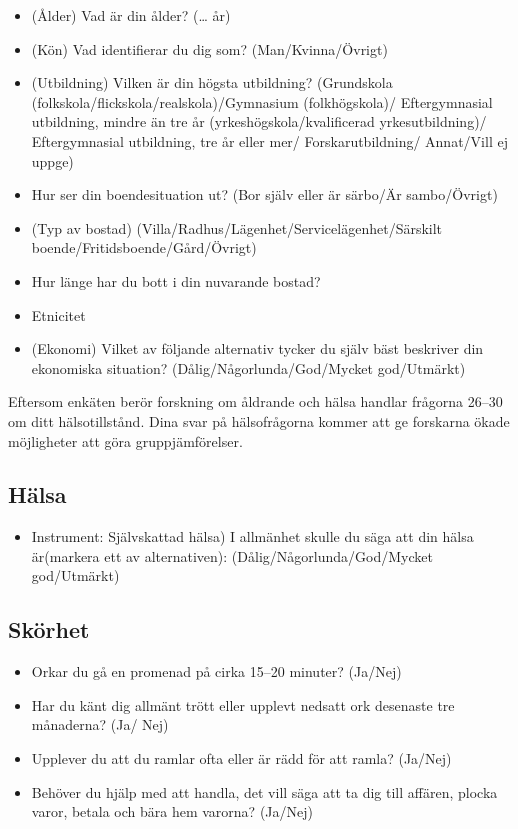 \documentclass[]{tufte-handout}
\providecommand{\tightlist}{%
  \setlength{\itemsep}{0pt}\setlength{\parskip}{0pt}}
\begin{document}
\begin{itemize}
\tightlist
\item
  (Ålder) Vad är din ålder? (\ldots{} år)
\item
  (Kön) Vad identifierar du dig som? (Man/Kvinna/Övrigt)
\item
  (Utbildning) Vilken är din högsta utbildning? (Grundskola
  (folkskola/flickskola/realskola)/Gymnasium (folkhögskola)/
  Eftergymnasial utbildning, mindre än tre år
  (yrkeshögskola/kvalificerad yrkesutbildning)/ Eftergymnasial
  utbildning, tre år eller mer/ Forskarutbildning/ Annat/Vill ej uppge)
\item
  Hur ser din boendesituation ut? (Bor själv eller är särbo/Är
  sambo/Övrigt)
\item
  (Typ av bostad) (Villa/Radhus/Lägenhet/Servicelägenhet/Särskilt
  boende/Fritidsboende/Gård/Övrigt)
\item
  Hur länge har du bott i din nuvarande bostad?
\item
  Etnicitet
\item
  (Ekonomi) Vilket av följande alternativ tycker du själv bäst beskriver
  din ekonomiska situation? (Dålig/Någorlunda/God/Mycket god/Utmärkt)
\end{itemize}

Eftersom enkäten berör forskning om åldrande och hälsa handlar frågorna
26--30 om ditt hälsotillstånd. Dina svar på hälsofrågorna kommer att ge
forskarna ökade möjligheter att göra gruppjämförelser.

\hypertarget{huxe4lsa}{%
\subsection{Hälsa}\label{huxe4lsa}}

\begin{itemize}
\tightlist
\item
  Instrument: Självskattad hälsa) I allmänhet skulle du säga att din
  hälsa är(markera ett av alternativen): (Dålig/Någorlunda/God/Mycket
  god/Utmärkt)
\end{itemize}

\hypertarget{skuxf6rhet}{%
\subsection{Skörhet}\label{skuxf6rhet}}

\begin{itemize}
\tightlist
\item
  Orkar du gå en promenad på cirka 15--20 minuter? (Ja/Nej)
\item
  Har du känt dig allmänt trött eller upplevt nedsatt ork desenaste tre
  månaderna? (Ja/ Nej)
\item
  Upplever du att du ramlar ofta eller är rädd för att ramla? (Ja/Nej)
\item
  Behöver du hjälp med att handla, det vill säga att ta dig till
  affären, plocka varor, betala och bära hem varorna? (Ja/Nej)
\end{itemize}
\end{document}
